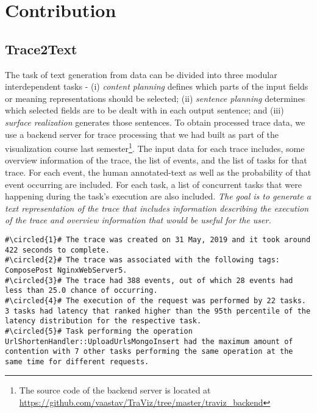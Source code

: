 \section{Contribution}
\label{sec:contribution}

\subsection{Trace2Text}

The task of text generation from data can be divided into 
three modular interdependent tasks - (i) \emph{content planning}
defines which parts of the input fields or meaning representations
should be selected; (ii) \emph{sentence planning} determines
which selected fields are to be dealt with in each output sentence;
and (iii) \emph{surface realization} generates those sentences.
To obtain processed trace data, we use a backend server
for trace processing that we had built as part of the visualization
course last semester\footnote{The source code of the backend server is located at \url{https://github.com/vaastav/TraViz/tree/master/traviz_backend}}.
The input data for each trace includes, some overview information of the trace,
the list of events, and the list of tasks for that trace. 
For each event, the human annotated-text as well as the probability of that event occurring
are included.
For each task, a list of concurrent tasks that were happening during the task's execution
are also included. \emph{The goal is to generate a text representation of the trace
that includes information describing the execution of the trace and overview information
that would be useful for the user.}

\begin{lstlisting}[caption={Annotated overview paragraph generated for a trace},captionpos=b,label={fig:trace_owtext}, escapechar=\#]
#\circled{1}# The trace was created on 31 May, 2019 and it took around 422 seconds to complete.
#\circled{2}# The trace was associated with the following tags: ComposePost NginxWebServer5.
#\circled{3}# The trace had 388 events, out of which 28 events had less than 25.0 chance of occurring.
#\circled{4}# The execution of the request was performed by 22 tasks. 3 tasks had latency that ranked higher than the 95th percentile of the latency distribution for the respective task. 
#\circled{5}# Task performing the operation UrlShortenHandler::UploadUrlsMongoInsert had the maximum amount of contention with 7 other tasks performing the same operation at the same time for different requests.
\end{lstlisting}

